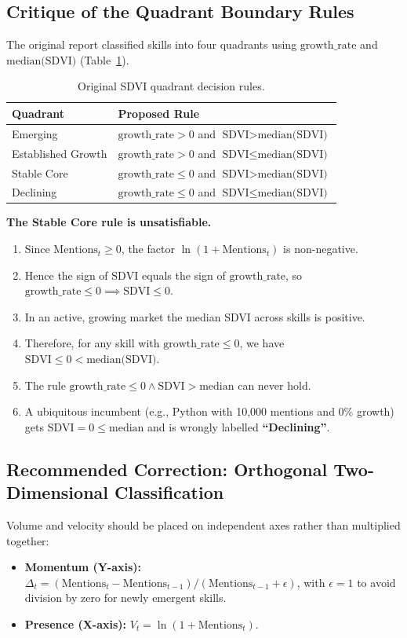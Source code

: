 \documentclass[10pt,a4paper]{article}
\begin{document}
\subsection{Critique of the Quadrant Boundary Rules}
The original report classified skills into four quadrants using $\text{growth\_rate}$ and $\text{median(SDVI)}$ (Table~\ref{tab:quadrants}).

\begin{table}[htbp]
\centering
\small
\begin{tabular}{@{}ll@{}}
\toprule
\textbf{Quadrant} & \textbf{Proposed Rule} \\
\midrule
Emerging & $\text{growth\_rate} > 0$ and $\text{SDVI} > \text{median(SDVI)}$ \\
Established Growth & $\text{growth\_rate} > 0$ and $\text{SDVI} \le \text{median(SDVI)}$ \\
Stable Core & $\text{growth\_rate} \le 0$ and $\text{SDVI} > \text{median(SDVI)}$ \\
Declining & $\text{growth\_rate} \le 0$ and $\text{SDVI} \le \text{median(SDVI)}$ \\
\bottomrule
\end{tabular}
\caption{Original SDVI quadrant decision rules.}
\label{tab:quadrants}
\end{table}

\textbf{The Stable Core rule is unsatisfiable.}
\begin{enumerate}
  \item Since $\text{Mentions}_t \ge 0$, the factor $\ln(1 + \text{Mentions}_t)$ is non-negative.
  \item Hence the sign of $\text{SDVI}$ equals the sign of $\text{growth\_rate}$, so $\text{growth\_rate} \le 0 \implies \text{SDVI} \le 0$.
  \item In an active, growing market the median SDVI across skills is positive.
  \item Therefore, for any skill with $\text{growth\_rate} \le 0$, we have $\text{SDVI} \le 0 < \text{median(SDVI)}$.
  \item The rule $\text{growth\_rate} \le 0 \land \text{SDVI} > \text{median}$ can never hold.
  \item A ubiquitous incumbent (e.g., Python with 10,000 mentions and $0\%$ growth) gets $\text{SDVI} = 0 \le \text{median}$ and is wrongly labelled \textbf{``Declining''}.
\end{enumerate}

\subsection{Recommended Correction: Orthogonal Two-Dimensional Classification}
Volume and velocity should be placed on independent axes rather than multiplied together:
\begin{itemize}
  \item \textbf{Momentum (Y-axis):} $\Delta_t = (\text{Mentions}_t - \text{Mentions}_{t-1}) / (\text{Mentions}_{t-1} + \epsilon)$, with $\epsilon = 1$ to avoid division by zero for newly emergent skills.
  \item \textbf{Presence (X-axis):} $V_t = \ln(1 + \text{Mentions}_t)$.
\end{itemize}
\end{document}
